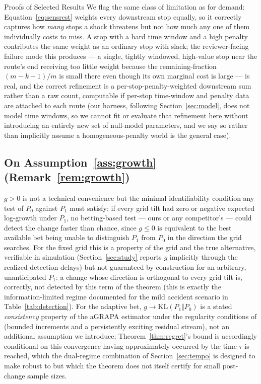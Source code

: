 \documentclass[trsc,dblanonrev]{informs4}
\newcommand{\KL}{\mathrm{KL}}
\begin{document}
\begin{APPENDIX}{Proofs of Selected Results}
We flag
the same class of limitation as for demand: Equation~\eqref{eq:sensrest}
weights every downstream stop equally, so it correctly captures how
\emph{many} stops a shock threatens but not how much any one of them
individually costs to miss. A stop with a hard time window and a high
penalty contributes the same weight as an ordinary stop with slack;
the reviewer-facing failure mode this produces --- a single, tightly
windowed, high-value stop near the route's end receiving too little
weight because the remaining-fraction $(m-k+1)/m$ is small there even
though its own marginal cost is large --- is real, and the correct
refinement is a per-stop-penalty-weighted downstream sum rather than a
raw count, computable if per-stop time-window and penalty data are
attached to each route (our harness, following
Section~\ref{sec:model}, does not model time windows, so we cannot
fit or evaluate that refinement here without introducing an entirely
new set of null-model parameters, and we say so rather than
implicitly assume a homogeneous-penalty world is the general case).

\subsection{On Assumption~\ref{ass:growth} (Remark~\ref{rem:growth})}

$g > 0$ is not a technical convenience but the minimal identifiability
condition any test of $P_0$ against $P_1$ must satisfy: if every grid
tilt had zero or negative expected log-growth under $P_1$, no
betting-based test --- ours or any competitor's --- could detect the
change faster than chance, since $g \le 0$ is equivalent to the
best available bet being unable to distinguish $P_1$ from $P_0$ in the
direction the grid searches. For the fixed grid this is a property of
the grid and the true alternative, verifiable in simulation
(Section~\ref{sec:study} reports $g$ implicitly through the realized
detection delays) but not guaranteed by construction for an arbitrary,
unanticipated $P_1$: a change whose direction is orthogonal to every
grid tilt is, correctly, not detected by this term of the theorem
(this is exactly the information-limited regime documented for the
mild accident scenario in Table~\ref{tab:detection}). For the adaptive
bet, $g \to \KL(P_1 \Vert P_0)$ is a stated \emph{consistency} property
of the aGRAPA estimator under the regularity conditions of
\citet{waudbysmithramdas2024} (bounded increments and a persistently
exciting residual stream), not an additional assumption we introduce;
Theorem~\ref{thm:regret}'s bound is accordingly conditional on this
convergence having approximately occurred by the time $\tau$ is
reached, which the dual-regime combination of
Section~\ref{sec:tempo} is designed to make robust to but which the
theorem does not itself certify for small post-change sample sizes.


\end{APPENDIX}
\end{document}
